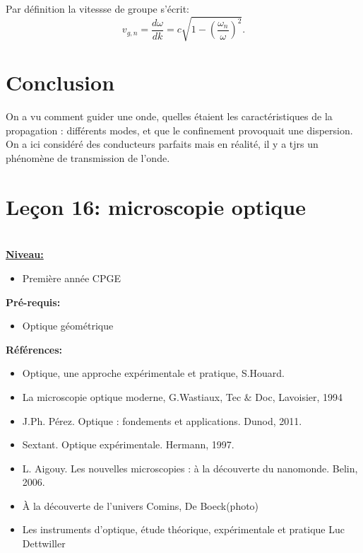 \documentclass[french, a4paper, 10pt, twocolumn, landscape]{article}
\begin{document}
Par définition la vitessse de groupe s'écrit:
\begin{equation}
	v_{g,n}=\frac{d\omega}{dk} = c\sqrt{1-\left(\frac{\omega_n}{\omega}\right)^2}.
\end{equation}

\section*{Conclusion}

On a vu comment guider une onde, quelles étaient les caractéristiques de la propagation : différents modes, et que le confinement provoquait une dispersion. On a ici considéré des conducteurs parfaits mais en réalité, il y a tjrs un phénomène de transmission de l’onde.

\clearpage 


\section*{Leçon 16: microscopie optique}

\hrulefill\\

\noindent\underline{\textbf{Niveau:}} 
\begin{itemize}
    \item Première année CPGE
\end{itemize}

\textbf{Pré-requis:}
\begin{itemize}
    \item Optique géométrique
\end{itemize}

\textbf{Références:}\medskip

\begin{itemize}
	\item Optique, une approche expérimentale et pratique,
	S.Houard.
	\item La microscopie optique moderne, G.Wastiaux,
	Tec $\&$ Doc, Lavoisier, 1994
	\item J.Ph. Pérez. Optique : fondements et applications. Dunod, 2011.
	\item Sextant. Optique expérimentale. Hermann, 1997.
	\item L. Aigouy. Les nouvelles microscopies : à la découverte du nanomonde.
	Belin, 2006.
	\item À la découverte de l'univers  Comins, De Boeck(photo)
	\item Les instruments d'optique, étude théorique, expérimentale et pratique Luc Dettwiller
\end{itemize}
\end{document}
